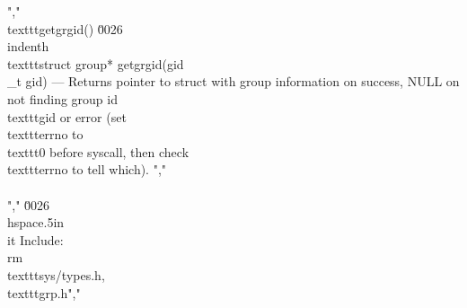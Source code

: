 ","    \\texttt{getgrgid()} \u0026 \\indenth\\texttt{struct group* getgrgid(gid\\_t gid)} --- Returns pointer to struct with group information on success, NULL on not finding group id \\texttt{gid} or error (set \\texttt{errno} to \\texttt{0} before syscall, then check \\texttt{errno} to tell which). ","        \\\\","    \u0026 \\hspace{.5in}\\it Include: \\rm\\texttt{sys/types.h}, \\texttt{grp.h}","        %